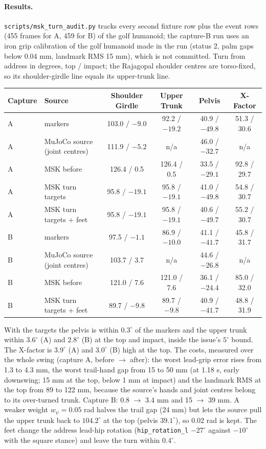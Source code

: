 \documentclass[11pt,a4paper]{article}
\begin{document}
\paragraph{Results.}
\texttt{scripts/msk\_turn\_audit.py} tracks every second fixture row plus the
event rows (455 frames for A, 459 for B) of the golf humanoid; the capture-B run uses
an iron grip calibration of the golf humanoid made in the run (status 2,
palm gaps below 0.04 mm, landmark RMS 15 mm), which is not committed. Turn
from address in degrees, top / impact; the Rajagopal shoulder centres are
torso-fixed, so its shoulder-girdle line equals its upper-trunk line.

\begin{center}
\small
\begin{tabular}{llcccc}
\hline
Capture & Source & Shoulder Girdle & Upper Trunk & Pelvis & X-Factor \\
\hline
A & markers & 103.0 / $-9.0$ & 92.2 / $-19.2$ & 40.9 / $-49.8$ & 51.3 / 30.6 \\
A & MuJoCo source (joint centres) & 111.9 / $-5.2$ & n/a & 46.0 / $-32.7$ & n/a \\
A & MSK before & 126.4 / 0.5 & 126.4 / 0.5 & 33.5 / $-29.1$ & 92.8 / 29.7 \\
A & MSK turn targets & 95.8 / $-19.1$ & 95.8 / $-19.1$ & 41.0 / $-49.8$ & 54.8 / 30.7 \\
A & MSK turn targets + feet & 95.8 / $-19.1$ & 95.8 / $-19.1$ & 40.6 / $-49.7$ & 55.2 / 30.7 \\
B & markers & 97.5 / $-1.1$ & 86.9 / $-10.0$ & 41.1 / $-41.7$ & 45.8 / 31.7 \\
B & MuJoCo source (joint centres) & 103.7 / 3.7 & n/a & 44.6 / $-26.8$ & n/a \\
B & MSK before & 121.0 / 7.6 & 121.0 / 7.6 & 36.1 / $-24.4$ & 85.0 / 32.0 \\
B & MSK turn targets + feet & 89.7 / $-9.8$ & 89.7 / $-9.8$ & 40.9 / $-41.7$ & 48.8 / 31.9 \\
\hline
\end{tabular}
\end{center}

With the targets the pelvis is within $0.3^\circ$ of the markers and the
upper trunk within $3.6^\circ$ (A) and $2.8^\circ$ (B) at the top and
impact, inside the issue's $5^\circ$ bound. The X-factor is $3.9^\circ$ (A)
and $3.0^\circ$ (B) high at the top. The costs, measured over the whole swing
(capture A, before $\rightarrow$ after): the worst lead-grip error rises from
1.3 to 4.3 mm, the worst trail-hand gap from 15 to 50 mm (at 1.18 s, early
downswing; 15 mm at the top, below 1 mm at impact) and the landmark RMS at the
top from 89 to 122 mm, because the source's hands and joint centres belong to
its over-turned trunk. Capture B: 0.8 $\rightarrow$ 3.4 mm and
15 $\rightarrow$ 39 mm. A weaker weight $w_\psi=0.05$ rad halves the trail gap
(24 mm) but lets the source pull the upper trunk back to $104.2^\circ$ at the
top (pelvis $39.1^\circ$), so 0.02 rad is kept. The feet change the address
lead-hip rotation (\texttt{hip\_rotation\_l} $-27^\circ$ against $-10^\circ$
with the square stance) and leave the turn within $0.4^\circ$.
\end{document}
